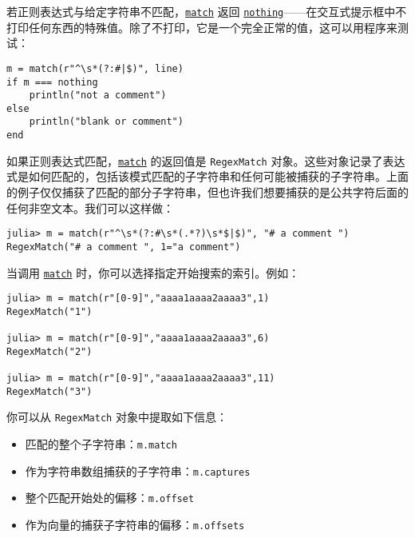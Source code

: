 若正则表达式与给定字符串不匹配，\hyperlink{2695862412477105800}{\texttt{match}} 返回 \hyperlink{9331422207248206047}{\texttt{nothing}}——在交互式提示框中不打印任何东西的特殊值。除了不打印，它是一个完全正常的值，这可以用程序来测试：




\begin{verbatim}
m = match(r"^\s*(?:#|$)", line)
if m === nothing
    println("not a comment")
else
    println("blank or comment")
end
\end{verbatim}



如果正则表达式匹配，\hyperlink{2695862412477105800}{\texttt{match}} 的返回值是 \texttt{RegexMatch} 对象。这些对象记录了表达式是如何匹配的，包括该模式匹配的子字符串和任何可能被捕获的子字符串。上面的例子仅仅捕获了匹配的部分子字符串，但也许我们想要捕获的是公共字符后面的任何非空文本。我们可以这样做：




\begin{verbatim}
julia> m = match(r"^\s*(?:#\s*(.*?)\s*$|$)", "# a comment ")
RegexMatch("# a comment ", 1="a comment")
\end{verbatim}



当调用 \hyperlink{2695862412477105800}{\texttt{match}} 时，你可以选择指定开始搜索的索引。例如：




\begin{verbatim}
julia> m = match(r"[0-9]","aaaa1aaaa2aaaa3",1)
RegexMatch("1")

julia> m = match(r"[0-9]","aaaa1aaaa2aaaa3",6)
RegexMatch("2")

julia> m = match(r"[0-9]","aaaa1aaaa2aaaa3",11)
RegexMatch("3")
\end{verbatim}



你可以从 \texttt{RegexMatch} 对象中提取如下信息：



\begin{itemize}
\item 匹配的整个子字符串：\texttt{m.match}


\item 作为字符串数组捕获的子字符串：\texttt{m.captures}


\item 整个匹配开始处的偏移：\texttt{m.offset}


\item 作为向量的捕获子字符串的偏移：\texttt{m.offsets}

\end{itemize}


